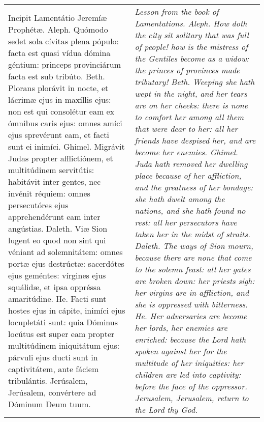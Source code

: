 \begin{tabular}{p{8cm} | p{8cm}}
Incipit Lamentátio Jeremíæ Prophétæ.
Aleph. Quómodo sedet sola cívitas plena pópulo: facta est quasi vídua dómina géntium: princeps provinciárum facta est sub tribúto.
Beth. Plorans plorávit in nocte, et lácrimæ ejus in maxíllis ejus: non est qui consolétur eam ex ómnibus caris ejus: omnes amíci ejus sprevérunt eam, et facti sunt ei inimíci.
Ghimel. Migrávit Judas propter afflictiónem, et multitúdinem servitútis: habitávit inter gentes, nec invénit réquiem: omnes persecutóres ejus apprehendérunt eam inter angústias.
Daleth. Viæ Sion lugent eo quod non sint qui véniant ad solemnitátem: omnes portæ ejus destrúctæ: sacerdótes ejus geméntes: vírgines ejus squálidæ, et ipsa oppréssa amaritúdine.
He. Facti sunt hostes ejus in cápite, inimíci ejus locupletáti sunt: quia Dóminus locútus est super eam propter multitúdinem iniquitátum ejus: párvuli ejus ducti sunt in captivitátem, ante fáciem tribulántis.
Jerúsalem, Jerúsalem, convértere ad Dóminum Deum tuum.
& \textit{Lesson from the book of Lamentations.
Aleph. How doth the city sit solitary that was full of people! how is the mistress of the Gentiles become as a widow: the princes of provinces made tributary!
Beth. Weeping she hath wept in the night, and her tears are on her cheeks: there is none to comfort her among all them that were dear to her: all her friends have despised her, and are become her enemies.
Ghimel. Juda hath removed her dwelling place because of her affliction, and the greatness of her bondage: she hath dwelt among the nations, and she hath found no rest: all her persecutors have taken her in the midst of straits.
Daleth. The ways of Sion mourn, because there are none that come to the solemn feast: all her gates are broken down: her priests sigh: her virgins are in affliction, and she is oppressed with bitterness.
He. Her adversaries are become her lords, her enemies are enriched: because the Lord hath spoken against her for the multitude of her iniquities: her children are led into captivity: before the face of the oppressor.
Jerusalem, Jerusalem, return to the Lord thy God.
}
\end{tabular}